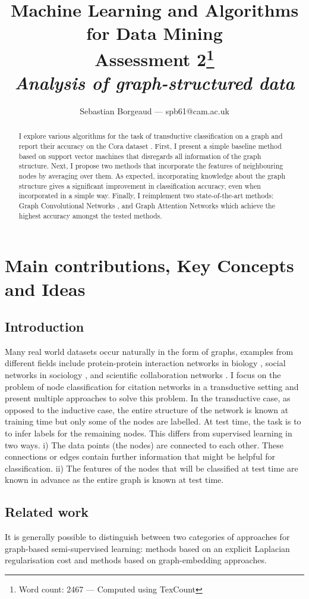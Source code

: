 \documentclass[12pt]{article}
\title{{\small{Machine Learning and Algorithms for Data Mining} \\
Assessment 2\footnote{Word count: 2467 --- Computed using TexCount}} \\
\textit{Analysis of graph-structured data}}
\author{Sebastian Borgeaud --- spb61@cam.ac.uk}
\theoremstyle{definition}
\begin{document}
\maketitle

\begin{abstract}
	I explore various algorithms for the task of transductive classification on a graph and report their accuracy on the Cora dataset \cite{cora}. First, I present a simple baseline method based on support vector machines that disregards all information of the graph structure. Next, I propose two methods that incorporate the features of neighbouring nodes by averaging over them. As expected, incorporating knowledge about the graph structure gives a significant improvement in classification accuracy, even when incorporated in a simple way. Finally, I reimplement two state-of-the-art methods: Graph Convolutional Networks \cite{kipf2017semi}, and Graph Attention Networks \cite{velickovic2018graph} which achieve the highest accuracy amongst the tested methods.
\end{abstract}

\section{Main contributions, Key Concepts and Ideas}
\subsection{Introduction}
Many real world datasets occur naturally in the form of graphs, examples from different fields include protein-protein interaction networks in biology \cite{schwikowski2000network}, social networks in sociology \cite{otte2002social}, and scientific collaboration networks \cite{newman2001structure}. I focus on the problem of node classification for citation networks in a transductive setting and present multiple approaches to solve this problem. In the transductive case, as opposed to the inductive case, the entire structure of the network is known at training time but only some of the nodes are labelled. At test time, the task is to to infer labels for the remaining nodes. This differs from supervised learning in two ways. i) The data points (the nodes) are connected to each other. These connections or edges contain further information that might be helpful for classification. ii) The features of the nodes that will be classified at test time are known in advance as the entire graph is known at test time. 

\subsection{Related work}
It is generally possible to distinguish between two categories of approaches for graph-based semi-supervised learning: methods based on an explicit Laplacian regularisation cost and methods based on graph-embedding approaches.
\end{document}
